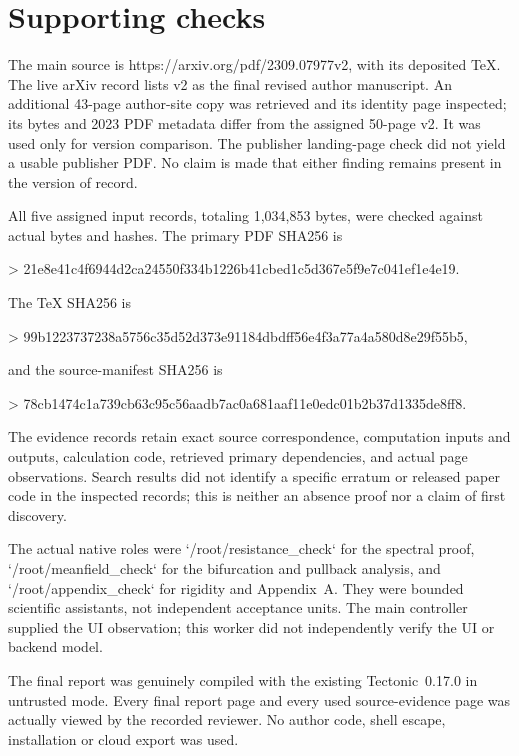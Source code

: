 \documentclass[10pt]{article}
\begin{document}
\section*{Supporting checks}
The main source is https://arxiv.org/pdf/2309.07977v2, with its deposited TeX. The live arXiv record lists v2 as the final revised author manuscript. An additional 43-page author-site copy was retrieved and its identity page inspected; its bytes and 2023 PDF metadata differ from the assigned 50-page v2. It was used only for version comparison. The publisher landing-page check did not yield a usable publisher PDF. No claim is made that either finding remains present in the version of record.\par
All five assigned input records, totaling 1,034,853 bytes, were checked against actual bytes and hashes. The primary PDF SHA256 is\par
> 21e8e41c4f6944d2ca24550f334b1226b41cbed1c5d367e5f9e7c041ef1e4e19.\par
The TeX SHA256 is\par
> 99b1223737238a5756c35d52d373e91184dbdff56e4f3a77a4a580d8e29f55b5,\par
and the source-manifest SHA256 is\par
> 78cb1474c1a739cb63c95c56aadb7ac0a681aaf11e0edc01b2b37d1335de8ff8.\par
The evidence records retain exact source correspondence, computation inputs and outputs, calculation code, retrieved primary dependencies, and actual page observations. Search results did not identify a specific erratum or released paper code in the inspected records; this is neither an absence proof nor a claim of first discovery.\par
The actual native roles were `/root/resistance\_check` for the spectral proof, `/root/meanfield\_check` for the bifurcation and pullback analysis, and `/root/appendix\_check` for rigidity and Appendix A. They were bounded scientific assistants, not independent acceptance units. The main controller supplied the UI observation; this worker did not independently verify the UI or backend model.\par
The final report was genuinely compiled with the existing Tectonic 0.17.0 in untrusted mode. Every final report page and every used source-evidence page was actually viewed by the recorded reviewer. No author code, shell escape, installation or cloud export was used.\par
\end{document}
